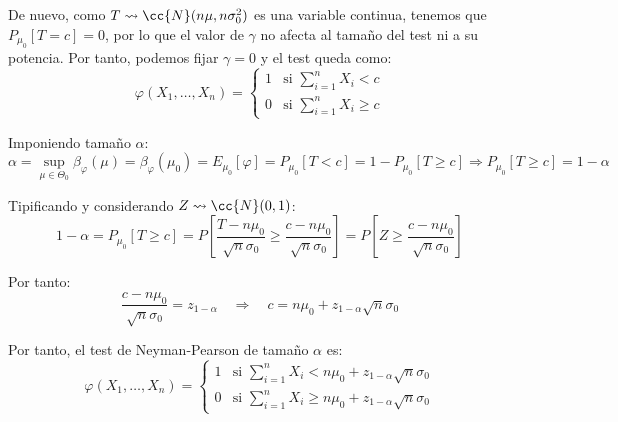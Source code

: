 \begin{ejercicio}
\begin{description}
        De nuevo, como $T\rightsquigarrow \cc{N}(n\mu, n\sigma_0^2)$ es una variable continua, tenemos que $P_{\mu_0}[T=c]=0$, por lo que el valor de $\gamma$ no afecta al tamaño del test ni a su potencia. Por tanto, podemos fijar $\gamma=0$ y el test queda como:
        \begin{equation*}
            \varphi(X_1, \ldots, X_n) = \left\{\begin{array}{ll}
                1 & \text{si\ } \sum\limits_{i=1}^{n}X_i<c \\
                 0 & \text{si\ } \sum\limits_{i=1}^{n}X_i \geq c
            \end{array}\right.
        \end{equation*}

        Imponiendo tamaño $\alpha$:
        \begin{equation*}
            \alpha = \sup_{\mu \in \Theta_0}\beta_\varphi(\mu) = \beta_\varphi(\mu_0) = E_{\mu_0}[\varphi] = P_{\mu_0}[T < c] = 1 - P_{\mu_0}[T \geq c]
            \Longrightarrow
            P_{\mu_0}[T \geq c] = 1 - \alpha
        \end{equation*}

        Tipificando y considerando $Z\rightsquigarrow \cc{N}(0,1)$:
        \begin{equation*}
            1-\alpha = P_{\mu_0}[T \geq c] = P\left[\frac{T-n\mu_0}{\sqrt{n}\sigma_0} \geq \frac{c-n\mu_0}{\sqrt{n}\sigma_0}\right] = P\left[Z \geq \frac{c-n\mu_0}{\sqrt{n}\sigma_0}\right]
        \end{equation*}

        Por tanto:
        \begin{equation*}
            \frac{c-n\mu_0}{\sqrt{n}\sigma_0} = z_{1-\alpha} \quad\Longrightarrow\quad c = n\mu_0 + z_{1-\alpha}\sqrt{n}\sigma_0
        \end{equation*}

        Por tanto, el test de Neyman-Pearson de tamaño $\alpha$ es:
        \begin{equation*}
            \varphi(X_1, \ldots, X_n) = \left\{\begin{array}{ll}
                1 & \text{si\ } \sum\limits_{i=1}^{n}X_i<n\mu_0 + z_{1-\alpha}\sqrt{n}\sigma_0 \\
                 0 & \text{si\ } \sum\limits_{i=1}^{n}X_i \geq n\mu_0 + z_{1-\alpha}\sqrt{n}\sigma_0
            \end{array}\right.
        \end{equation*}


\end{description}
\end{ejercicio}

